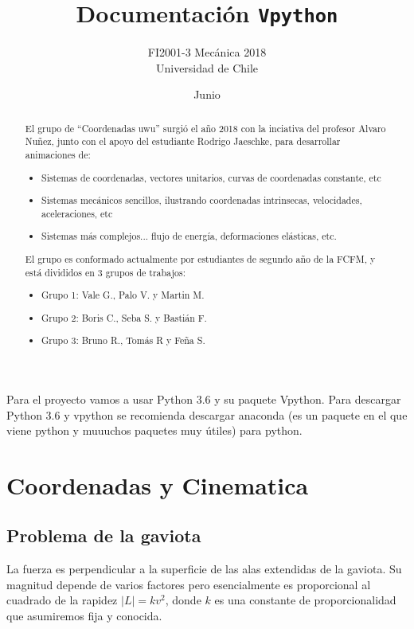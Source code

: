 \documentclass[letterpaper,12pt]{article}
\title{\Huge\bfseries Documentación \texttt{Vpython}}
\author{\Large FI2001-3 Mecánica 2018\\ Universidad de Chile}
\date{Junio}
\begin{document}
\pagestyle{empty}
\maketitle
\begin{abstract}
El grupo de ``Coordenadas uwu'' surgió el año 2018 con la inciativa del profesor Alvaro Nuñez, junto con el apoyo del estudiante Rodrigo Jaeschke, para desarrollar animaciones de:
\begin{itemize}
\item Sistemas de coordenadas, vectores unitarios, curvas de coordenadas constante, etc
\item Sistemas mecánicos sencillos, ilustrando coordenadas intrinsecas, velocidades, aceleraciones, etc
\item Sistemas más complejos... flujo de energía, deformaciones elásticas, etc. 
\end{itemize}
El grupo es conformado actualmente por estudiantes de segundo año de la FCFM, y está divididos en 3 grupos de trabajos:
\begin{itemize}
	\item Grupo 1: Vale G., Palo V. y Martin M.
	\item Grupo 2: Boris C., Seba S. y Bastián F.
	\item Grupo 3: Bruno R., Tomás R y Feña S.
\end{itemize}
\end{abstract}
\thispagestyle{empty} %

\newpage
\thispagestyle{empty}
\tableofcontents
\listoftables
\listoffigures
\printunsrtglossary[type=symbols,style=alttreegroup,title={Lista de simbolos}]
\newpage
Para el proyecto vamos a usar Python 3.6 y su paquete Vpython. Para descargar Python 3.6 y vpython se recomienda descargar anaconda (es un paquete en el que viene python y muuuchos paquetes muy útiles) para python. 

\section{Coordenadas y Cinematica}
\subsection*{Problema de la gaviota}
La fuerza es perpendicular a la superficie de las alas extendidas de la gaviota. 
Su magnitud depende de varios factores pero esencialmente es proporcional al cuadrado de la rapidez $|L| = kv^2$,
donde $k$ es una constante de proporcionalidad que asumiremos fija y conocida.
\end{document}

